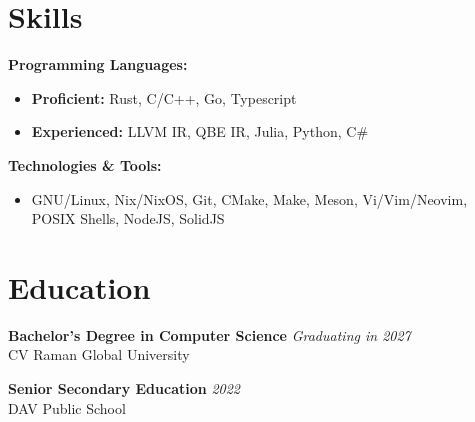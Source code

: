 \section*{Skills}
\textbf{Programming Languages:}
\begin{itemize}[noitemsep, topsep=0pt]
    \item \textbf{Proficient:} Rust, C/C++, Go, Typescript
    \item \textbf{Experienced:} LLVM IR, QBE IR, Julia, Python, C\# \vspace{0.5em}
\end{itemize}

\noindent\textbf{Technologies \& Tools:}
\begin{itemize}[noitemsep, topsep=0pt]
    \item GNU/Linux, Nix/NixOS, Git, CMake, Make, Meson, Vi/Vim/Neovim, POSIX Shells, NodeJS, SolidJS
\end{itemize}

\section*{Education}
\noindent\textbf{Bachelor's Degree in Computer Science} \hfill \textit{Graduating in 2027}\\
\noindent CV Raman Global University \vspace{0.5em}

\noindent\textbf{Senior Secondary Education} \hfill \textit{2022}\\
\noindent DAV Public School


